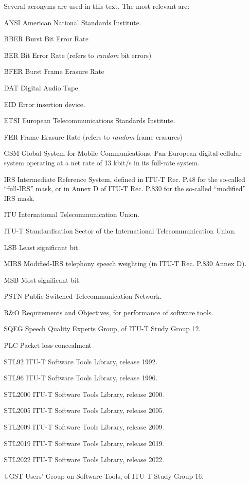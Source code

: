 Several acronyms are used in this text.
The most relevant are:
\begin{Descr}{20mm}
\item[ANSI]  American National Standards Institute.
\item[BBER]  Burst Bit Error Rate
\item[BER]   Bit Error Rate (refers to {\em random} bit errors)
\item[BFER]  Burst Frame Erasure Rate
\item[DAT]   Digital Audio Tape.
\item[EID]   Error insertion device.
\item[ETSI]  European Telecommunications Standards Institute.
\item[FER]   Frame Erasure Rate (refers to {\em random} frame erasures)
\item[GSM]   Global System for Mobile Communications. Pan-European digital-cellular system operating at a net rate of 13 kbit/s in its full-rate system.
\item[IRS]   Intermediate Reference System, defined in ITU-T Rec. P.48 for the so-called ``full-IRS'' mask, or in Annex D of ITU-T Rec. P.830 for the so-called ``modified'' IRS mask.
\item[ITU]   International Telecommunication Union.
\item[ITU-T] Standardisation Sector of the International Telecommunication Union.
\item[LSB]   Least significant bit.
\item[MIRS]  Modified-IRS telephony speech weighting (in ITU-T Rec. P.830 Annex D).
\item[MSB]   Most significant bit.
\item[PSTN]  Public Switched Telecommunication Network.
\item[R\&O]  Requirements and Objectives, for performance of software tools.
\item[SQEG]  Speech Quality Experts Group, of ITU-T Study Group 12.
\item[PLC]   Packet loss concealment
\item[STL92] ITU-T Software Tools Library, release 1992.
\item[STL96] ITU-T Software Tools Library, release 1996.
\item[STL2000] ITU-T Software Tools Library, release 2000.
\item[STL2005] ITU-T Software Tools Library, release 2005.
\item[STL2009] ITU-T Software Tools Library, release 2009.
\item[STL2019] ITU-T Software Tools Library, release 2019.
\item[STL2022] ITU-T Software Tools Library, release 2022.
\item[UGST]  Users' Group on Software Tools, of ITU-T Study Group 16.
\end{Descr}


